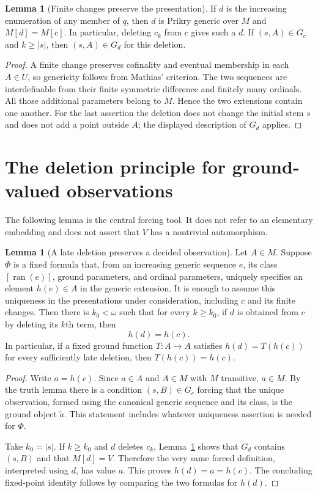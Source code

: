 \documentclass[11pt,letterpaper]{article}
\theoremstyle{definition}
\newtheorem{lemma}[definition]{Lemma}
\numberwithin{equation}{section}
\newcommand{\ran}{\operatorname{ran}}
\begin{document}
\begin{lemma}[Finite changes preserve the presentation]\label{lem:finitechange}
If $d$ is the increasing enumeration of any member of $q$, then $d$ is
Prikry generic over $M$ and $M[d]=M[c]$. In particular, deleting $c_k$ from
$c$ gives such a $d$. If $(s,A)\in G_c$ and $k\ge |s|$, then
$(s,A)\in G_d$ for this deletion.
\end{lemma}

\begin{proof}
A finite change preserves cofinality and eventual membership in each
$A\in U$, so genericity follows from Mathias' criterion. The two sequences
are interdefinable from their finite symmetric difference and finitely many
ordinals. All those additional parameters belong to $M$. Hence the two
extensions contain one another. For the last assertion the deletion does
not change the initial stem $s$ and does not add a point outside $A$;
the displayed description of $G_d$ applies.
\end{proof}

\section{The deletion principle for ground-valued observations}\label{sec:deletion}

The following lemma is the central forcing tool. It does not refer to an
elementary embedding and does not assert that $V$ has a nontrivial
automorphism.

\begin{lemma}[A late deletion preserves a decided observation]\label{lem:observation}
Let $A\in M$. Suppose $\Phi$ is a fixed formula that, from an increasing
generic sequence $e$, its class $[\ran(e)]$, ground parameters, and ordinal
parameters, uniquely specifies an element $h(e)\in A$ in the generic
extension. It is enough to assume this uniqueness in the presentations
under consideration, including $c$ and its finite changes. Then there is
$k_0<\omega$ such that for every $k\ge k_0$, if $d$ is obtained from $c$
by deleting its $k$th term, then
\[
 h(d)=h(c).
\]
In particular, if a fixed ground function $T:A\to A$ satisfies
$h(d)=T(h(c))$ for every sufficiently late deletion, then
$T(h(c))=h(c)$.
\end{lemma}

\begin{proof}
Write $a=h(c)$. Since $a\in A$ and $A\in M$ with $M$ transitive, $a\in M$.
By the truth lemma there is a condition $(s,B)\in G_c$ forcing that the
unique observation, formed using the canonical generic sequence and its
class, is the ground object $\check a$. This statement includes whatever
uniqueness assertion is needed for $\Phi$.

Take $k_0=|s|$. If $k\ge k_0$ and $d$ deletes $c_k$,
Lemma~\ref{lem:finitechange} shows that $G_d$ contains $(s,B)$ and that
$M[d]=V$. Therefore the very same forced definition, interpreted using
$d$, has value $a$. This proves $h(d)=a=h(c)$. The concluding fixed-point
identity follows by comparing the two formulas for $h(d)$.
\end{proof}
\end{document}
